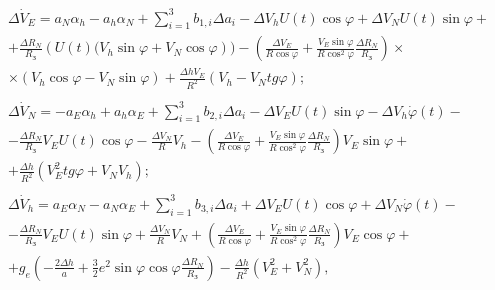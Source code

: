 \begin{equation}
\begin{array}{l}{\Delta \dot{V}_{E} =a_{N} \alpha_{h} -a_{h} \alpha_{N} +\sum_{i=1}^{3}b_{1,i}  \Delta a_{i} -\Delta V_{h} U(t)\cos \varphi +\Delta V_{N}U(t)\sin \varphi +} \\ 
{+\frac{\Delta R_{N} }{R_{\text{З}} } \left(U(t)(V_{h} \sin \varphi +V_{N}\cos \varphi \right))-(\frac{\Delta V_{E} }{R\cos \varphi } +\frac{V_{E} \sin \varphi}{R\cos ^{2} \varphi } \frac{\Delta R_{N} }{R_{\text{З}} } )\times } \\ 
{\times (V_{h} \cos \varphi -V_{N} \sin \varphi )+\frac{\Delta hV_{E} }{R^{2} } (V_{h} -V_{N}tg\varphi);} \\
\\
{\Delta \dot{V}_{N} =-a_{E}\alpha_{h} +a_{h} \alpha_{E} +\sum_{i=1}^{3}b_{2,i}  \Delta a_{i} -\Delta V_{E}U(t)\sin \varphi -\Delta V_{h} \dot{\varphi }(t)-} \\ 
{-\frac{\Delta R_{N} }{R_{\text{З}}} V_{E} U(t)\cos \varphi -\frac{\Delta V_{N} }{R} V_{h} -(\frac{\Delta V_{E} }{R\cos \varphi } +\frac{V_{E} \sin \varphi }{R\cos ^{2} \varphi } \frac{\Delta R_{N} }{R_{\text{З}} } )V_{E} \sin \varphi +} \\ 
{+\frac{\Delta h}{R^{2} } (V_{E}^{2} tg\varphi +V_{N} V_{h} );} \\
\\
{\Delta \dot{V}_{h} =a_{E} \alpha_{N} -a_{N} \alpha_{E} +\sum_{i=1}^{3}b_{3,i}  \Delta a_{i} +\Delta V_{E} U(t)\cos \varphi +\Delta V_{N} \dot{\varphi }(t)-} \\ 
{-\frac{\Delta R_{N} }{R_{\text{З}} } V_{E} U(t)\sin \varphi +\frac{\Delta V_{N} }{R} V_{N} +(\frac{\Delta V_{E} }{R\cos \varphi } +\frac{V_{E} \sin \varphi }{R\cos ^{2} \varphi } \frac{\Delta R_{N} }{R_{\text{З}} } )V_{E} \cos \varphi +} \\ 
{+g_{e} \left(-\frac{2\Delta h}{a} +\frac{3}{2} e^{2} \sin \varphi \cos \varphi \frac{\Delta R_{N} }{R_{\text{З}} } \right)-\frac{\Delta h}{R^{2} } \left(V_{E}^{2} +V_{N}^{2} \right),} 
\end{array}
\label{eq:dVsdins}
\end{equation}
